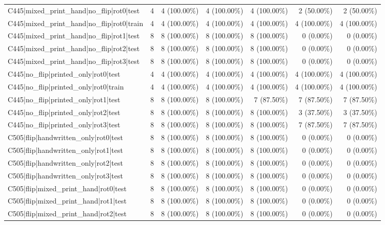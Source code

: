 \begin{longtable}{>{\raggedright\arraybackslash}p{5cm}rrrrrr}
C445|mixed\_print\_hand|no\_flip|rot0|test & 4 & 4 (100.00\%) & 4 (100.00\%) & 4 (100.00\%) & 2 (50.00\%) & 2 (50.00\%) \\
C445|mixed\_print\_hand|no\_flip|rot0|train & 4 & 4 (100.00\%) & 4 (100.00\%) & 4 (100.00\%) & 4 (100.00\%) & 4 (100.00\%) \\
C445|mixed\_print\_hand|no\_flip|rot1|test & 8 & 8 (100.00\%) & 8 (100.00\%) & 8 (100.00\%) & 0 (0.00\%) & 0 (0.00\%) \\
C445|mixed\_print\_hand|no\_flip|rot2|test & 8 & 8 (100.00\%) & 8 (100.00\%) & 8 (100.00\%) & 0 (0.00\%) & 0 (0.00\%) \\
C445|mixed\_print\_hand|no\_flip|rot3|test & 8 & 8 (100.00\%) & 8 (100.00\%) & 8 (100.00\%) & 0 (0.00\%) & 0 (0.00\%) \\
C445|no\_flip|printed\_only|rot0|test & 4 & 4 (100.00\%) & 4 (100.00\%) & 4 (100.00\%) & 4 (100.00\%) & 4 (100.00\%) \\
C445|no\_flip|printed\_only|rot0|train & 4 & 4 (100.00\%) & 4 (100.00\%) & 4 (100.00\%) & 4 (100.00\%) & 4 (100.00\%) \\
C445|no\_flip|printed\_only|rot1|test & 8 & 8 (100.00\%) & 8 (100.00\%) & 7 (87.50\%) & 7 (87.50\%) & 7 (87.50\%) \\
C445|no\_flip|printed\_only|rot2|test & 8 & 8 (100.00\%) & 8 (100.00\%) & 8 (100.00\%) & 3 (37.50\%) & 3 (37.50\%) \\
C445|no\_flip|printed\_only|rot3|test & 8 & 8 (100.00\%) & 8 (100.00\%) & 8 (100.00\%) & 7 (87.50\%) & 7 (87.50\%) \\
C505|flip|handwritten\_only|rot0|test & 8 & 8 (100.00\%) & 8 (100.00\%) & 8 (100.00\%) & 0 (0.00\%) & 0 (0.00\%) \\
C505|flip|handwritten\_only|rot1|test & 8 & 8 (100.00\%) & 8 (100.00\%) & 8 (100.00\%) & 0 (0.00\%) & 0 (0.00\%) \\
C505|flip|handwritten\_only|rot2|test & 8 & 8 (100.00\%) & 8 (100.00\%) & 8 (100.00\%) & 0 (0.00\%) & 0 (0.00\%) \\
C505|flip|handwritten\_only|rot3|test & 8 & 8 (100.00\%) & 8 (100.00\%) & 8 (100.00\%) & 0 (0.00\%) & 0 (0.00\%) \\
C505|flip|mixed\_print\_hand|rot0|test & 8 & 8 (100.00\%) & 8 (100.00\%) & 8 (100.00\%) & 0 (0.00\%) & 0 (0.00\%) \\
C505|flip|mixed\_print\_hand|rot1|test & 8 & 8 (100.00\%) & 8 (100.00\%) & 8 (100.00\%) & 0 (0.00\%) & 0 (0.00\%) \\
C505|flip|mixed\_print\_hand|rot2|test & 8 & 8 (100.00\%) & 8 (100.00\%) & 8 (100.00\%) & 0 (0.00\%) & 0 (0.00\%) \\

\end{longtable}
